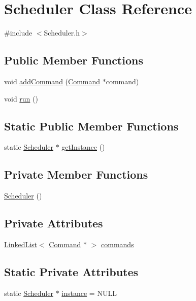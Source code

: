 \hypertarget{classScheduler}{\section{Scheduler Class Reference}
\label{classScheduler}
}


{\ttfamily \#include $<$Scheduler.\-h$>$}

\subsection*{Public Member Functions}
\begin{DoxyCompactItemize}
\item 
void \hyperlink{classScheduler_a73f2e49a61315d8138cfce5b180fd891}{add\-Command} (\hyperlink{classCommand}{Command} $\ast$command)
\item 
void \hyperlink{classScheduler_a58fba108ce2748870a6288cd6f5fd1e3}{run} ()
\end{DoxyCompactItemize}
\subsection*{Static Public Member Functions}
\begin{DoxyCompactItemize}
\item 
static \hyperlink{classScheduler}{Scheduler} $\ast$ \hyperlink{classScheduler_a3fc3905ac5589d51e464100f3b8c0138}{get\-Instance} ()
\end{DoxyCompactItemize}
\subsection*{Private Member Functions}
\begin{DoxyCompactItemize}
\item 
\hyperlink{classScheduler_a3b61aac11466cd45ae42ab8c2b0013f6}{Scheduler} ()
\end{DoxyCompactItemize}
\subsection*{Private Attributes}
\begin{DoxyCompactItemize}
\item 
\hyperlink{classLinkedList}{Linked\-List}$<$ \hyperlink{classCommand}{Command} $\ast$ $>$ \hyperlink{classScheduler_ad320e81fdf3a591b1f1d638f8fa5065d}{commands}
\end{DoxyCompactItemize}
\subsection*{Static Private Attributes}
\begin{DoxyCompactItemize}
\item 
static \hyperlink{classScheduler}{Scheduler} $\ast$ \hyperlink{classScheduler_ae683641d0a2c37275631cebb77387e2f}{instance} = N\-U\-L\-L
\end{DoxyCompactItemize}


